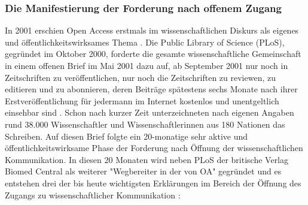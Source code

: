 \subsubsection{Die Manifestierung der Forderung nach offenem Zugang}

In 2001 erschien Open Access erstmals im wissenschaftlichen Diskurs als eigenes und öffentlichkeitswirksames Thema \cite{cite:19}. Die Public Library of Science (PLoS), gegründet im Oktober 2000, forderte die gesamte wissenschaftliche Gemeinschaft in einem offenen Brief im Mai 2001 dazu auf, ab September 2001 nur noch in Zeitschriften zu veröffentlichen, nur noch die Zeitschriften zu reviewen, zu editieren und zu abonnieren, deren Beiträge spätestens sechs Monate nach ihrer Erstveröffentlichung für jedermann im Internet kostenlos und unentgeltlich einsehbar sind \cite{cite:20}. Schon nach kurzer Zeit unterzeichneten nach eigenen Angaben \cite{cite:19a} rund 38.000 Wissenschaftler und Wissenschaftlerinnen aus 180 Nationen das Schreiben. Auf diesen Brief folgte ein 20-monatige sehr aktive und öffentlichkeitswirksame Phase der Forderung nach Öffnung der wissenschaftlichen Kommunikation. In diesen 20 Monaten wird neben PLoS der britische Verlag Biomed Central als weiterer "Wegbereiter in der von OA" \cite{suchen-Hoffmann-Zugang-undVerwertung-oeffentlicher-Informationen} gegründet und es entstehen drei der bis heute wichtigsten Erklärungen im Bereich der Öffnung des Zugangs zu wissenschaftlicher Kommunikation \cite{CREATe_2014}:
